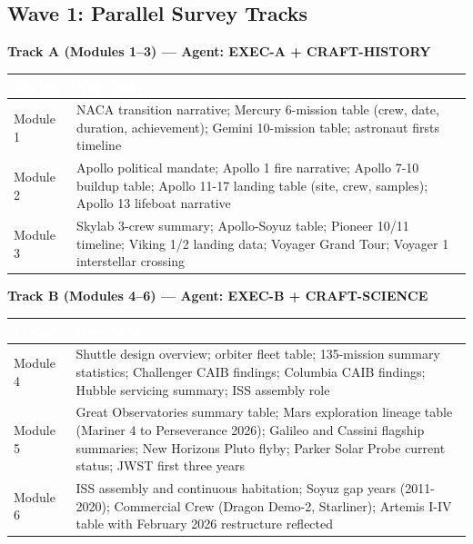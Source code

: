 \documentclass[11pt,letterpaper]{article}
\newcommand{\tableheader}[1]{\textbf{\sffamily\textcolor{white}{#1}}}
\begin{document}
\subsection{Wave 1: Parallel Survey Tracks}

\textbf{Track A (Modules 1--3) --- Agent: EXEC-A + CRAFT-HISTORY}

\begin{center}
\begin{tabularx}{\textwidth}{L{2.5cm}X}
\toprule
{}
\tableheader{Module} & \tableheader{Key Tasks} \\
\midrule
Module 1 & NACA transition narrative; Mercury 6-mission table (crew, date, duration, achievement); Gemini 10-mission table; astronaut firsts timeline \\
Module 2 & Apollo political mandate; Apollo 1 fire narrative; Apollo 7-10 buildup table; Apollo 11-17 landing table (site, crew, samples); Apollo 13 lifeboat narrative \\
Module 3 & Skylab 3-crew summary; Apollo-Soyuz table; Pioneer 10/11 timeline; Viking 1/2 landing data; Voyager Grand Tour; Voyager 1 interstellar crossing \\
\bottomrule
\end{tabularx}
\end{center}

\textbf{Track B (Modules 4--6) --- Agent: EXEC-B + CRAFT-SCIENCE}

\begin{center}
\begin{tabularx}{\textwidth}{L{2.5cm}X}
\toprule
{}
\tableheader{Module} & \tableheader{Key Tasks} \\
\midrule
Module 4 & Shuttle design overview; orbiter fleet table; 135-mission summary statistics; Challenger CAIB findings; Columbia CAIB findings; Hubble servicing summary; ISS assembly role \\
Module 5 & Great Observatories summary table; Mars exploration lineage table (Mariner 4 to Perseverance 2026); Galileo and Cassini flagship summaries; New Horizons Pluto flyby; Parker Solar Probe current status; JWST first three years \\
Module 6 & ISS assembly and continuous habitation; Soyuz gap years (2011-2020); Commercial Crew (Dragon Demo-2, Starliner); Artemis I-IV table with February 2026 restructure reflected \\
\bottomrule
\end{tabularx}
\end{center}
\end{document}
